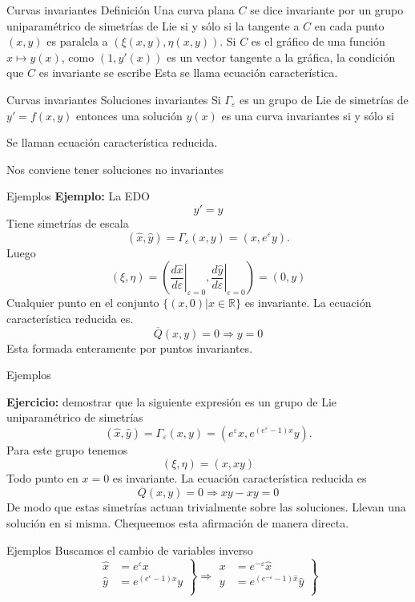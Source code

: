 \documentclass{article}
\newcommand{\rr}{\mathbb{R}}
\renewcommand{\emph}[1]{\textcolor[rgb]{1,0,0}{#1}}
\renewcommand{\epsilon}{\varepsilon}
\begin{document}
{Curvas invariantes}
{Definición}
Una curva plana $C$ se dice invariante por un grupo uniparamétrico de simetrías de Lie si y sólo si la tangente a  $C$ en cada punto $(x,y)$ es paralela a $(\xi(x,y),\eta(x,y))$. Si $C$ es el gráfico de una función $x\mapsto y(x)$, como $(1,y'(x))$ es un vector tangente a la gráfica, la condición que $C$ es invariante se escribe
Esta se llama \emph{ecuación característica}.






{Curvas invariantes}
 {Soluciones invariantes}
Si $\Gamma_{\epsilon}$ es un grupo de Lie de simetrías de $y'=f(x,y)$ entonces una solución $y(x)$ es una curva invariantes si y sólo si

Se llaman \emph{ecuación característica reducida}.


 \emph{Nos conviene tener soluciones no invariantes}




{Ejemplos}
\textbf{Ejemplo:} La EDO
\[y'=y\]
Tiene simetrías de escala
\[(\hat{x},\hat{y})=\Gamma_{\epsilon}(x,y)=(x,e^{\epsilon}y).\]
Luego 
\[(\xi,\eta)=\left(\left.\frac{d\hat{x}}{d\epsilon}\right|_{\epsilon=0}, \left.\frac{d\hat{y}}{d\epsilon}\right|_{\epsilon=0}   \right)=(0,y)\]
Cualquier punto en el conjunto $\{(x,0)|x\in\rr\}$  es invariante. La ecuación característica reducida es.
\[\overline{Q}(x,y)=0\Rightarrow y=0\]
Esta formada enteramente por puntos invariantes.




{Ejemplos}

\textbf{Ejercicio:} demostrar que la siguiente expresión es un grupo de Lie uniparamétrico de simetrías
\[(\hat{x},\hat{y})=\Gamma_{\epsilon}(x,y)=(e^{\epsilon}x,e^{(e^{\epsilon}-1)x}y).\]
Para este grupo tenemos
\[(\xi,\eta)=(x,xy)\]
Todo punto en $x=0$ es invariante. La ecuación característica reducida es
\[\overline{Q}(x,y)=0\Rightarrow xy-xy=0\]
De modo que estas simetrías actuan trivialmente sobre las soluciones. Llevan una solución en si misma. Chequeemos esta afirmación de manera directa. 





{Ejemplos}
Buscamos el cambio de variables inverso
\[
\left.
\begin{array}{ll} 
  \hat{x}&= e^{\epsilon}x\\
  \hat{y}&=e^{(e^{\epsilon}-1)x}y\\
\end{array}
\right\} 
\Rightarrow  
    \left.
\begin{array}{ll} 
  x&= e^{-\epsilon}\hat{x}\\
  y&=e^{(e^{-\epsilon}-1)\hat{x}}\hat{y}\\
\end{array}
\right\} 
\]    
\end{document}
